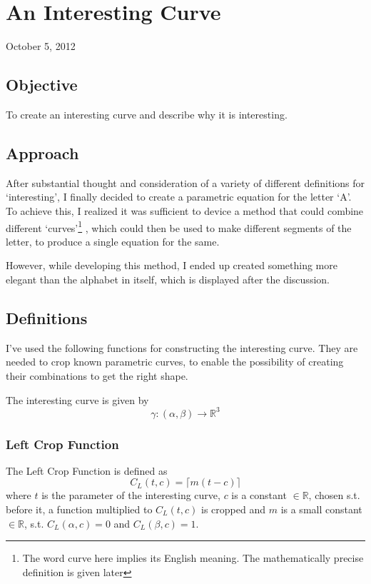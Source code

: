 \chapter{An Interesting Curve}
\begin{flushright}
October 5, 2012
\end{flushright}
\section{Objective}
	To create an interesting curve and describe why it is interesting.

\section{Approach}
	After substantial thought and consideration of a variety of different definitions for `interesting', I finally decided to create a parametric equation for the letter `A'. To achieve this, I realized it was sufficient to device a method that could combine different `curves'\footnote{The word curve here implies its English meaning. The mathematically precise definition is given later} , which could then be used to make different segments of the letter, to produce a single equation for the same.
	\par
	However, while developing this method, I ended up created something more elegant than the alphabet in itself, which is displayed after the discussion.

\section{Definitions}
	I've used the following functions for constructing the interesting curve. They are needed to crop known parametric curves, to enable the possibility of creating their combinations to get the right shape.
	\par
	The interesting curve is given by 
	\begin{equation}
		\gamma : (\alpha,\beta) \rightarrow \mathbb R^{3}
	\end{equation}
		\subsection{Left Crop Function}
			The Left Crop Function is defined as
			\begin{equation}
				C_L(t,c) = \lceil m (t - c) \rceil
				\label{left}
			\end{equation}
			where $t$ is the parameter of the interesting curve, $c$ is a constant $\in \mathbb R$, chosen s.t. before it, a function multiplied to $C_L(t,c)$ is cropped and $m$ is a small constant $\in \mathbb R$, s.t. $C_L(\alpha,c)=0$ and $C_L(\beta,c)=1$.
